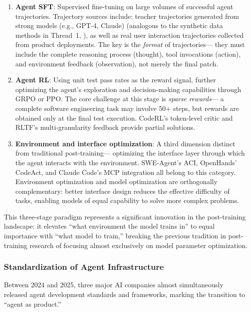 \begin{enumerate}[leftmargin=*]
  \item \textbf{Agent SFT}:
    Supervised fine-tuning on large volumes of successful agent trajectories.
    Trajectory sources include:
    teacher trajectories generated from strong models (e.g., GPT-4, Claude)
    (analogous to the synthetic data methods in Thread~1, ),
    as well as real user interaction trajectories collected from product deployments.
    The key is the \emph{format} of trajectories---
    they must include the complete reasoning process (thought), tool invocations (action),
    and environment feedback (observation), not merely the final patch.
  \item \textbf{Agent RL}:
    Using unit test pass rates as the reward signal,
    further optimizing the agent's exploration and decision-making capabilities through GRPO or PPO.
    The core challenge at this stage is \emph{sparse rewards}---
    a complete software engineering task may involve 50+ steps,
    but rewards are obtained only at the final test execution.
    CodeRL's token-level critic and RLTF's multi-granularity feedback
    provide partial solutions.
  \item \textbf{Environment and interface optimization}:
    A third dimension distinct from traditional post-training---
    optimizing the interface layer through which the agent interacts with the environment.
    SWE-Agent's ACI, OpenHands' CodeAct,
    and Claude Code's MCP integration all belong to this category.
    Environment optimization and model optimization are orthogonally complementary:
    better interface design reduces the effective difficulty of tasks,
    enabling models of equal capability to solve more complex problems.
\end{enumerate}

This three-stage paradigm represents a significant innovation in the post-training landscape:
it elevates ``what environment the model trains in''
to equal importance with ``what model to train,''
breaking the previous tradition in post-training research of focusing almost exclusively on model parameter optimization.

\subsubsection{Standardization of Agent Infrastructure}

Between 2024 and 2025, three major AI companies almost simultaneously released agent development standards and frameworks,
marking the transition to ``agent as product.''

